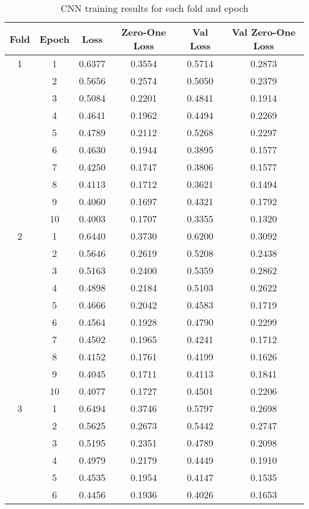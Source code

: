 \begin{center}
\begin{longtable}{|c|c|c|c|c|c|}
\caption{CNN training results for each fold and epoch} \\
\hline
\textbf{Fold} & \textbf{Epoch} & \textbf{Loss} & \textbf{Zero-One Loss} & \textbf{Val Loss} & \textbf{Val Zero-One Loss} \\
\hline
1 & 1 & 0.6377 & 0.3554 & 0.5714 & 0.2873 \\
 & 2 & 0.5656 & 0.2574 & 0.5050 & 0.2379 \\
 & 3 & 0.5084 & 0.2201 & 0.4841 & 0.1914 \\
 & 4 & 0.4641 & 0.1962 & 0.4494 & 0.2269 \\
 & 5 & 0.4789 & 0.2112 & 0.5268 & 0.2297 \\
 & 6 & 0.4630 & 0.1944 & 0.3895 & 0.1577 \\
 & 7 & 0.4250 & 0.1747 & 0.3806 & 0.1577 \\
 & 8 & 0.4113 & 0.1712 & 0.3621 & 0.1494 \\
 & 9 & 0.4060 & 0.1697 & 0.4321 & 0.1792 \\
 & 10 & 0.4003 & 0.1707 & 0.3355 & 0.1320 \\
\hline
2 & 1 & 0.6440 & 0.3730 & 0.6200 & 0.3092 \\
 & 2 & 0.5646 & 0.2619 & 0.5208 & 0.2438 \\
 & 3 & 0.5163 & 0.2400 & 0.5359 & 0.2862 \\
 & 4 & 0.4898 & 0.2184 & 0.5103 & 0.2622 \\
 & 5 & 0.4666 & 0.2042 & 0.4583 & 0.1719 \\
 & 6 & 0.4564 & 0.1928 & 0.4790 & 0.2299 \\
 & 7 & 0.4502 & 0.1965 & 0.4241 & 0.1712 \\
 & 8 & 0.4152 & 0.1761 & 0.4199 & 0.1626 \\
 & 9 & 0.4045 & 0.1711 & 0.4113 & 0.1841 \\
 & 10 & 0.4077 & 0.1727 & 0.4501 & 0.2206 \\
\hline
3 & 1 & 0.6494 & 0.3746 & 0.5797 & 0.2698 \\
 & 2 & 0.5625 & 0.2673 & 0.5442 & 0.2747 \\
 & 3 & 0.5195 & 0.2351 & 0.4789 & 0.2098 \\
 & 4 & 0.4979 & 0.2179 & 0.4449 & 0.1910 \\
 & 5 & 0.4535 & 0.1954 & 0.4147 & 0.1535 \\
 & 6 & 0.4456 & 0.1936 & 0.4026 & 0.1653 \\

\end{longtable}
\end{center}
